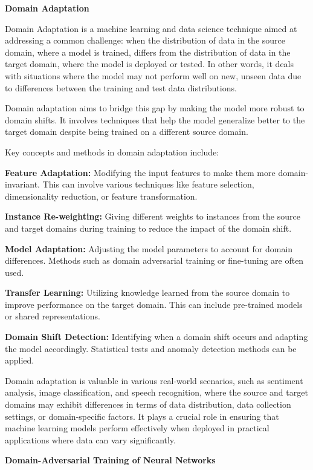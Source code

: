 \documentclass[sigconf,authordraft]{acmart}
\begin{document}
\noindent\textbf{Domain Adaptation}

\noindent Domain Adaptation is a machine learning and data science technique aimed at addressing a common challenge: when the distribution of data in the source domain, where a model is trained, differs from the distribution of data in the target domain, where the model is deployed or tested. In other words, it deals with situations where the model may not perform well on new, unseen data due to differences between the training and test data distributions.

\noindent Domain adaptation aims to bridge this gap by making the model more robust to domain shifts. It involves techniques that help the model generalize better to the target domain despite being trained on a different source domain.

\noindent Key concepts and methods in domain adaptation include:

\textbf{Feature Adaptation:} Modifying the input features to make them more domain-invariant. This can involve various techniques like feature selection, dimensionality reduction, or feature transformation.\cite{16}

\textbf{Instance Re-weighting:} Giving different weights to instances from the source and target domains during training to reduce the impact of the domain shift.

\textbf{Model Adaptation:} Adjusting the model parameters to account for domain differences. Methods such as domain adversarial training or fine-tuning are often used.\cite{17}

\textbf{Transfer Learning:} Utilizing knowledge learned from the source domain to improve performance on the target domain. This can include pre-trained models or shared representations.\cite{18}

\textbf{Domain Shift Detection:} Identifying when a domain shift occurs and adapting the model accordingly. Statistical tests and anomaly detection methods can be applied.

\noindent Domain adaptation is valuable in various real-world scenarios, such as sentiment analysis, image classification, and speech recognition, where the source and target domains may exhibit differences in terms of data distribution, data collection settings, or domain-specific factors. It plays a crucial role in ensuring that machine learning models perform effectively when deployed in practical applications where data can vary significantly.

\noindent\textbf{Domain-Adversarial Training of Neural Networks}
\end{document}
